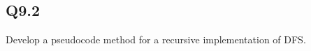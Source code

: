 \documentclass{article}
\begin{document}
\subsection*{Q9.2}
Develop a pseudocode method for a recursive implementation of DFS.
\newpage
\end{document}
